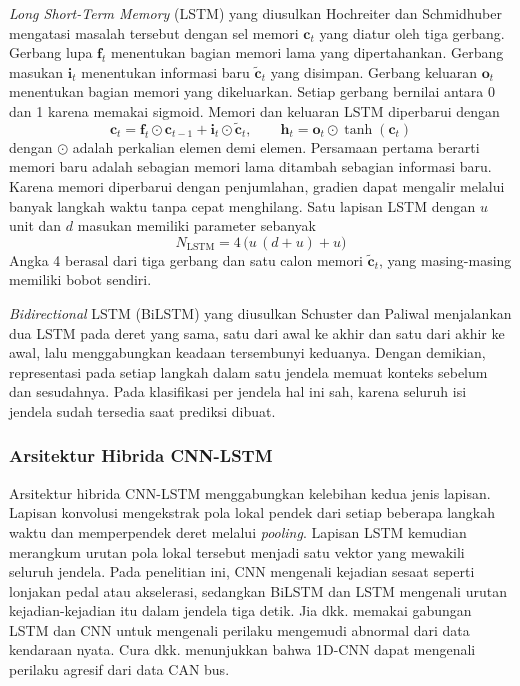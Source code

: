\textit{Long Short-Term Memory} (LSTM) yang diusulkan Hochreiter dan Schmidhuber mengatasi masalah tersebut dengan sel memori $\mathbf{c}_{t}$ yang diatur oleh tiga gerbang. Gerbang lupa $\mathbf{f}_{t}$ menentukan bagian memori lama yang dipertahankan. Gerbang masukan $\mathbf{i}_{t}$ menentukan informasi baru $\tilde{\mathbf{c}}_{t}$ yang disimpan. Gerbang keluaran $\mathbf{o}_{t}$ menentukan bagian memori yang dikeluarkan. Setiap gerbang bernilai antara 0 dan 1 karena memakai sigmoid. Memori dan keluaran LSTM diperbarui dengan
\begin{equation}
  \mathbf{c}_{t} = \mathbf{f}_{t} \odot \mathbf{c}_{t-1} + \mathbf{i}_{t} \odot \tilde{\mathbf{c}}_{t}, \qquad
  \mathbf{h}_{t} = \mathbf{o}_{t} \odot \tanh(\mathbf{c}_{t})
  \label{eq:lstm}
\end{equation}
dengan $\odot$ adalah perkalian elemen demi elemen. Persamaan pertama berarti memori baru adalah sebagian memori lama ditambah sebagian informasi baru. Karena memori diperbarui dengan penjumlahan, gradien dapat mengalir melalui banyak langkah waktu tanpa cepat menghilang. Satu lapisan LSTM dengan $u$ unit dan $d$ masukan memiliki parameter sebanyak
\begin{equation}
  N_{\mathrm{LSTM}} = 4\,\big(u\,(d + u) + u\big)
  \label{eq:param-lstm}
\end{equation}
Angka 4 berasal dari tiga gerbang dan satu calon memori $\tilde{\mathbf{c}}_{t}$, yang masing-masing memiliki bobot sendiri.

\textit{Bidirectional} LSTM (BiLSTM) yang diusulkan Schuster dan Paliwal menjalankan dua LSTM pada deret yang sama, satu dari awal ke akhir dan satu dari akhir ke awal, lalu menggabungkan keadaan tersembunyi keduanya. Dengan demikian, representasi pada setiap langkah dalam satu jendela memuat konteks sebelum dan sesudahnya. Pada klasifikasi per jendela hal ini sah, karena seluruh isi jendela sudah tersedia saat prediksi dibuat.

\subsubsection{Arsitektur Hibrida CNN-LSTM}
Arsitektur hibrida CNN-LSTM menggabungkan kelebihan kedua jenis lapisan. Lapisan konvolusi mengekstrak pola lokal pendek dari setiap beberapa langkah waktu dan memperpendek deret melalui \textit{pooling}. Lapisan LSTM kemudian merangkum urutan pola lokal tersebut menjadi satu vektor yang mewakili seluruh jendela. Pada penelitian ini, CNN mengenali kejadian sesaat seperti lonjakan pedal atau akselerasi, sedangkan BiLSTM dan LSTM mengenali urutan kejadian-kejadian itu dalam jendela tiga detik. Jia dkk. memakai gabungan LSTM dan CNN untuk mengenali perilaku mengemudi abnormal dari data kendaraan nyata. Cura dkk. menunjukkan bahwa 1D-CNN dapat mengenali perilaku agresif dari data CAN bus.

